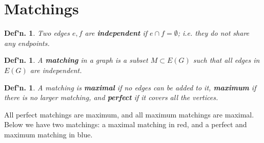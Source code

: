 \documentclass[12pt, a4paper]{book}
\newtheorem{definition}[theorem]{Def'n.}
\theoremstyle{nonumberplain}
\begin{document}
\section{Matchings}
\begin{definition}
    Two edges $e,f$ are \textbf{independent} if $e\cap f=\emptyset$; i.e. they do not share any endpoints.
\end{definition}
\begin{definition}
    A \textbf{matching} in a graph is a subset $M\subset E(G)$ such that all edges in $E(G)$ are independent.
\end{definition}
\begin{definition}
    A matching is \textbf{maximal} if no edges can be added to it, \textbf{maximum} if there is no larger matching, and \textbf{perfect} if it covers all the vertices.
\end{definition}
All perfect matchings are maximum, and all maximum matchings are maximal.
Below we have two matchings: a maximal matching in red, and a perfect and maximum matching in blue.
\begin{center}
\end{center}
\end{document}
